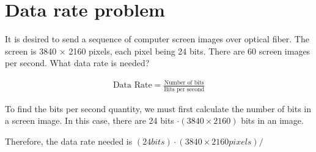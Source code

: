 
\section{Data rate problem}
It is desired to send a sequence of computer screen images over optical fiber. The screen is 3840 $\times$ 2160 pixels, each pixel being 24 bits. There are 60 screen images per second. What data rate is needed?

\begin{align*}
	\text{Data Rate} = \frac{\text{Number of bits}}{\text{Bits per second}}
\end{align*}

To find the bits per second quantity, we must first calculate the number of bits in a screen image. In this case, there are 24 bits $\cdot (3840 \times 2160)$ bits in an image.

Therefore, the data rate needed is $(24 bits) \cdot (3840 \times 2160 pixels) / $

\section{}
\section{}
\section{}
\section{}
\section{}
\section{}
